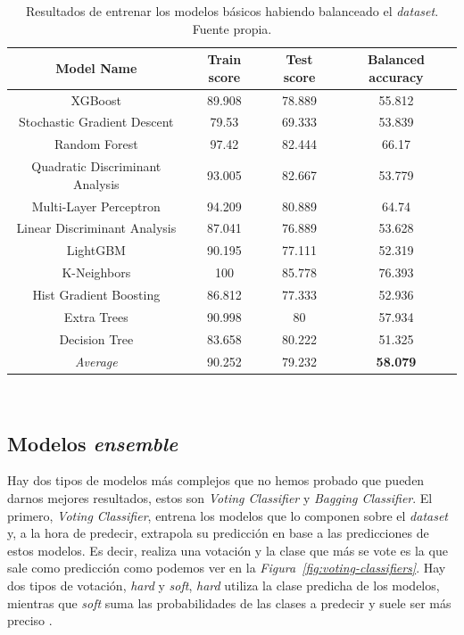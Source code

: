 \begin{table}[!ht]
    \centering
    \begin{tabular}{|c|ccc|}\hline
        Model Name & Train score & Test score & Balanced accuracy \\ \hline
        XGBoost & 89.908 & 78.889 & 55.812 \\ 
        Stochastic Gradient Descent & 79.53 & 69.333 & 53.839 \\ 
        Random Forest & 97.42 & 82.444 & 66.17 \\ 
        Quadratic Discriminant Analysis & 93.005 & 82.667 & 53.779 \\ 
        Multi-Layer Perceptron & 94.209 & 80.889 & 64.74 \\ 
        Linear Discriminant Analysis & 87.041 & 76.889 & 53.628 \\ 
        LightGBM & 90.195 & 77.111 & 52.319 \\ 
        K-Neighbors & 100 & 85.778 & 76.393 \\ 
        Hist Gradient Boosting & 86.812 & 77.333 & 52.936 \\ 
        Extra Trees & 90.998 & 80 & 57.934 \\ 
        Decision Tree & 83.658 & 80.222 & 51.325 \\ \hline
        \textit{Average} & 90.252 & 79.232 & \textbf{58.079} \\ \hline
    \end{tabular}
    \caption{Resultados de entrenar los modelos básicos habiendo balanceado el \textit{dataset}. Fuente propia.}\ \label{tab:balanced-basic-training}
\end{table}

\subsection{Modelos \textit{ensemble}}

Hay dos tipos de modelos más complejos que no hemos probado que pueden darnos mejores resultados, estos son \textit{Voting Classifier} y \textit{Bagging Classifier}. El primero, \textit{Voting Classifier}, entrena los modelos que lo componen sobre el \textit{dataset} y, a la hora de predecir, extrapola su predicción en base a las predicciones de estos modelos. Es decir, realiza una votación y la clase que más se vote es la que sale como predicción como podemos ver en la \textit{Figura\ \ref{fig:voting-classifiers}}. Hay dos tipos de votación, \textit{hard} y \textit{soft}, \textit{hard} utiliza la clase predicha de los modelos, mientras que \textit{soft} suma las probabilidades de las clases a predecir y suele ser más preciso \cite{Ensemble96:online}. 

